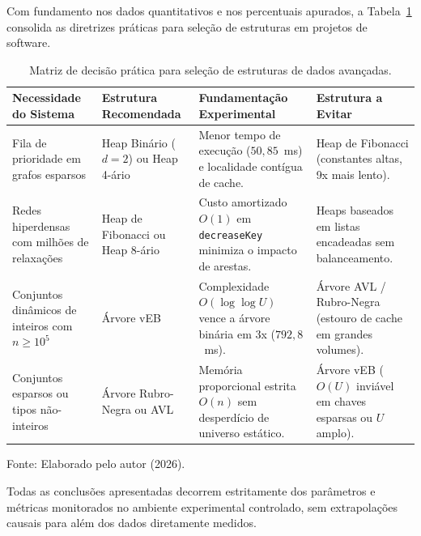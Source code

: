 \documentclass[12pt,a4paper]{report}
\begin{document}
Com fundamento nos dados quantitativos e nos percentuais apurados, a Tabela~\ref{tab:diretrizes-engenharia} consolida as diretrizes práticas para seleção de estruturas em projetos de software.

\begin{table}[htbp]
  \centering
  \caption{Matriz de decisão prática para seleção de estruturas de dados avançadas.}
  \label{tab:diretrizes-engenharia}
  \small
  \begin{tabular}{>{\raggedright\arraybackslash}p{3.4cm}>{\raggedright\arraybackslash}p{2.8cm}>{\raggedright\arraybackslash}p{4.1cm}>{\raggedright\arraybackslash}p{3.7cm}}
    \toprule
    \textbf{Necessidade do Sistema} & \textbf{Estrutura Recomendada} & \textbf{Fundamentação Experimental} & \textbf{Estrutura a Evitar} \\
    \midrule
    Fila de prioridade em grafos esparsos & Heap Binário ($d=2$) ou Heap 4-ário & Menor tempo de execução ($50{,}85$~ms) e localidade contígua de cache. & Heap de Fibonacci (constantes altas, 9x mais lento). \\
    \midrule
    Redes hiperdensas com milhões de relaxações & Heap de Fibonacci ou Heap 8-ário & Custo amortizado $O(1)$ em \texttt{decreaseKey} minimiza o impacto de arestas. & Heaps baseados em listas encadeadas sem balanceamento. \\
    \midrule
    Conjuntos dinâmicos de inteiros com $n \ge 10^5$ & Árvore vEB & Complexidade $O(\log \log U)$ vence a árvore binária em 3x ($792{,}8$~ms). & Árvore AVL / Rubro-Negra (estouro de cache em grandes volumes). \\
    \midrule
    Conjuntos esparsos ou tipos não-inteiros & Árvore Rubro-Negra ou AVL & Memória proporcional estrita $O(n)$ sem desperdício de universo estático. & Árvore vEB ($O(U)$ inviável em chaves esparsas ou $U$ amplo). \\
    \bottomrule
  \end{tabular}
  \vspace{0.2cm}
  
  \raggedright\footnotesize Fonte: Elaborado pelo autor (2026).
\end{table}

Todas as conclusões apresentadas decorrem estritamente dos parâmetros e métricas monitorados no ambiente experimental controlado, sem extrapolações causais para além dos dados diretamente medidos.
\end{document}
